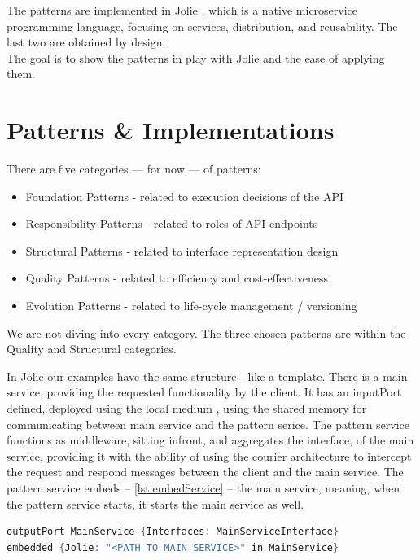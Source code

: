 \documentclass[12pt]{article}
\begin{document}
The patterns are implemented in Jolie \cite{JolieAboutPage:1}, which is a native microservice programming language, focusing on services, distribution, and reusability. The last two are obtained by design. \\
The goal is to show the patterns in play with Jolie and the ease of applying them. 

\newpage

\section{Patterns \& Implementations}

There are five categories --- for now --- of  patterns: 

\begin{itemize}
    \item Foundation Patterns - related to execution decisions of the API
    \item Responsibility Patterns - related to roles of API endpoints
    \item Structural Patterns - related to interface representation design
    \item Quality Patterns - related to efficiency and cost-effectiveness
    \item Evolution Patterns - related to life-cycle management / versioning
\end{itemize}

We are not diving into every category. The three chosen patterns are within the Quality and Structural categories. 

In Jolie our examples have the same structure - like a template. There is a main service, providing the requested functionality by the client. It has an inputPort defined, deployed using the local medium \cite{LocalLoc:1}, using the shared memory for communicating between main service and the pattern serice. The pattern service functions as middleware, sitting infront, and aggregates the interface, of the main service, providing it with the ability of using the courier \cite{Courier:1} architecture to intercept the request and respond messages between the client and the main service. The pattern service embeds -- \ref{lst:embedService} -- the main service, meaning, when the pattern service starts, it starts the main service as well. 

\begin{lstlisting}[caption=Embed main service into the pattern service, 
    captionpos=b, language=java, label=embedService, frame=single]
outputPort MainService {Interfaces: MainServiceInterface}
embedded {Jolie: "<PATH_TO_MAIN_SERVICE>" in MainService}
\end{lstlisting}
\end{document}
